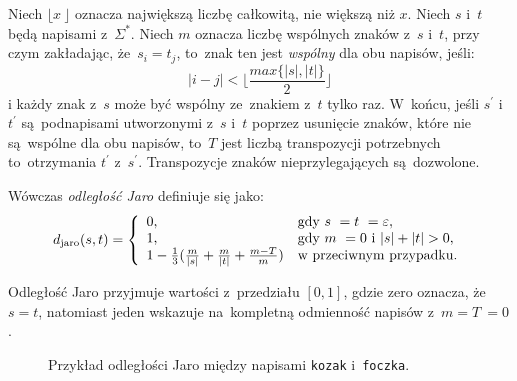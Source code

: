 \documentclass{praca1}
\begin{document}
\begin{definition}
Niech $\lfloor x~\rfloor$ oznacza największą liczbę całkowitą, nie większą niż $x$. Niech $s$ i~$t$ będą napisami z~$\Sigma^*$. Niech $m$ oznacza liczbę wspólnych znaków z~$s$ i~$t$, przy czym zakładając, że~$s_i = t_j$, to~znak ten jest \emph{wspólny} dla obu napisów, jeśli:
\begin{equation*}
|i -j| < \Bigg\lfloor\frac{max\{|s|, |t|\}}{2}\Bigg\rfloor
\end{equation*}
i każdy znak z~$s$ może być wspólny ze~znakiem z~$t$ tylko raz. W~końcu, jeśli $s^\prime$ i~$t^\prime$ są~podnapisami utworzonymi z~$s$ i~$t$ poprzez usunięcie znaków, które nie są~wspólne dla obu napisów, to~$T$ jest liczbą transpozycji potrzebnych to~otrzymania $t^\prime$ z~$s^\prime$. Transpozycje znaków nieprzylegających są~dozwolone.

Wówczas \emph{odległość Jaro} definiuje się jako:
\begin{equation}
\label{eq:011}
d_{\mathrm{jaro}}(s,t) = \left\{
\begin{array}{l l}     
    0, & \text{gdy } s~= t~= \varepsilon, \\
    1, & \text{gdy } m~= 0 \text{ i~} |s| + |t| > 0, \\
    1 - \frac{1}{3} (\frac{m}{|s|} + \frac{m}{|t|} + \frac{m - T}{m}) & \text{w przeciwnym przypadku}.
\end{array}\right.
\end{equation}
\end{definition}

Odległość Jaro przyjmuje wartości z~przedziału $[0,1]$, gdzie zero oznacza, że~$s = t$, natomiast jeden wskazuje na~kompletną odmienność napisów z~$m = T~= 0$.

\begin{figure}[width=80pt]
\centering
{}
\cprotect\caption{Przykład odległości Jaro między napisami \verb|kozak| i~\verb|foczka|.}\label{rys:005}
\end{figure}
\end{document}
